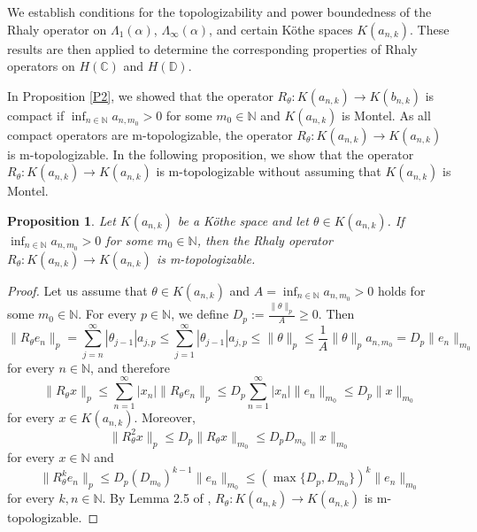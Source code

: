 \documentclass{birkjour}
\newtheorem{prop}[thm]{Proposition}
\theoremstyle{definition}
\theoremstyle{remark}
\numberwithin{equation}{section}
\begin{document}
We establish conditions for the topologizability and power boundedness of 
the Rhaly operator on $\Lambda_{1}(\alpha)$, $\Lambda_{\infty}(\alpha)$, 
and certain Köthe spaces $K(a_{n,k})$. These results are then applied to 
determine the corresponding properties of Rhaly operators on $H(\mathbb{C})$ 
and $H(\mathbb{D})$.

In Proposition \ref{P2}, we showed that the operator $R_{\theta}:K(a_{n,k})\to K(b_{n,k})$ is compact if $\displaystyle \inf_{n\in \mathbb{N}} a_{n,m_{0}}>0$ for some $m_{0}\in \mathbb{N}$ and $K(a_{n,k})$ is Montel. As all compact operators are m-topologizable, the operator $R_{\theta}: K(a_{n,k})\to K(a_{n,k})$ is m-topologizable.  In the following proposition, we show that the operator $R_{\theta}: K(a_{n,k})\to K(a_{n,k})$ is m-topologizable without assuming that $K(a_{n,k})$ is Montel.

\begin{prop}\label{PBG} Let $K(a_{n,k})$ be a Köthe space and let $\theta\in K(a_{n,k})$. If  \\$\displaystyle \inf_{n\in \mathbb{N}}a_{n,m_{0}}>0$ for some $m_{0}\in \mathbb{N}$, then the Rhaly operator $R_{\theta}:K(a_{n,k})\to K(a_{n,k})$ is m-topologizable.
\end{prop}
\begin{proof} Let us assume that $\theta\in K(a_{n,k})$ and  $\displaystyle A=\inf_{n\in \mathbb{N}}  a_{n,m_{0}}>0$ holds for some $m_{0}\in\mathbb{N}$.  For every $p\in \mathbb{N}$, we define $\displaystyle D_{p}:=\frac{\|\theta\|_{p}}{A}\geq 0$. Then
\begin{equation*}
\|R_{\theta}e_{n}\|_{p}=\sum^{\infty}_{j=n}|\theta_{j-1}|a_{j,p}\leq \sum^{\infty}_{j=1}|\theta_{j-1}|a_{j,p} \leq \|\theta\|_{p}\leq\frac{1}{ A}\|\theta\|_{p}a_{n,m_{0}}= D_{p} \|e_{n}\|_{m_0}
\end{equation*}
for every $n\in \mathbb{N}$, and therefore
\begin{equation*}
\|R_{\theta}x\|_{p}\leq \sum^{\infty}_{n=1}|x_{n}|\|R_{\theta}e_{n}\|_{p}\leq D_{p}\sum^{\infty}_{n=1}|x_{n}|\|e_{n}\|_{m_{0}}\leq D_{p}\|x\|_{m_{0}}
\end{equation*}
for every $x\in K(a_{n,k})$. Moreover,
\begin{equation*}
\|R^{2}_{\theta}x\|_{p}\leq D_{p} \|R_{\theta}x\|_{m_{0}}\leq D_{p} D_{m_{0}} \|x\|_{m_{0}}   
\end{equation*}
for every $x \in \mathbb{N}$ and 
\begin{equation}\label{RGCPB}
\|R^{k}_{\theta}e_{n}\|_{p}\leq D_{p} (D_{m_{0}})^{k-1}\|e_{n}\|_{m_{0}} \leq (\max\{D_{p}, D_{m_{0}}\})^{k} \|e_{n}\|_{m_0}    
\end{equation}
for every $k,n\in \mathbb{N}$. By Lemma 2.5 of \cite{N3},  $R_{\theta}: K(a_{n,k})\to K(a_{n,k})$ is m-topologizable.
\end{proof}
\end{document}
